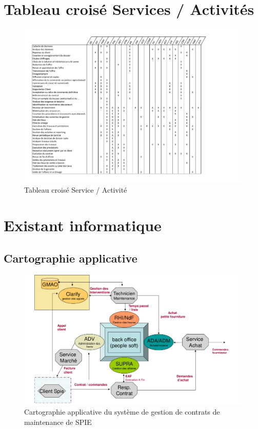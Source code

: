\section{Tableau crois\'e Services / Activit\'es}

\begin{landscape}
\begin{figure}[h]
    \centering
    \includegraphics[width=220mm]{../../pipeautage/tableau_service_activitee.pdf}
    \caption{Tableau crois\'e Service / Activit\'e}
    \label{tableau:service_activitee}
\end{figure}
\end{landscape}


\section{Existant informatique}

\subsection{Cartographie applicative}

\begin{figure}[h]
    \centering
    \includegraphics[width=140mm]{./images/cartographie_applicative.png}
    \caption{Cartographie applicative du système de gestion de contrats de maintenance de SPIE}
    \label{diagram:carto_app}
\end{figure}


